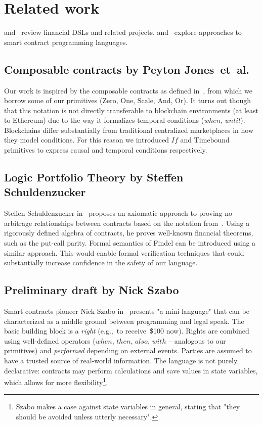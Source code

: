 
\section{Related work}

\cite{Schiller2013} and~\cite{Hvitved2010} review financial DSLs and related projects.
\cite{Seijas2016} and~\cite{Clack2016} explore approaches to smart contract programming languages.

\subsection{Composable contracts by Peyton Jones~et~al.}

Our work is inspired by the composable contracts as defined in~\cite{Jones2003}, from which we borrow some of our primitives (\(\mathrm{Zero}\), \(\mathrm{One}\), \(\mathrm{Scale}\), \(\mathrm{And}\), \(\mathrm{Or}\)).
It turns out though that this notation is not directly transferable to blockchain environments (at least to Ethereum) due to the way it formalizes temporal conditions (\(when\), \(until\)).
Blockchains differ substantially from traditional centralized marketplaces in how they model conditions.
For this reason we introduced \(If\) and \(\mathrm{Timebound}\) primitives to express causal and temporal conditions respectively.


\subsection{Logic Portfolio Theory by Steffen Schuldenzucker}

Steffen Schuldenzucker in~\cite{Schuldenzucker2016} proposes an axiomatic approach to proving no-arbitrage relationships between contracts based on the notation from~\cite{Jones2003}.
Using a rigorously defined algebra of contracts, he proves well-known financial theorems, such as the put-call parity.
Formal semantics of Findel can be introduced using a similar approach.
This would enable formal verification techniques that could substantially increase confidence in the safety of our language.


\subsection{Preliminary draft by Nick Szabo}

Smart contracts pioneer Nick Szabo in~\cite{Szabo2002} presents "a mini-language" that can be characterized as a middle ground between programming and legal speak.
The basic building block is a \textit{right} (e.g.,~to receive~\$100 now).
Rights are combined using well-defined operators (\(when\), \(then\), \(also\), \(with\) -- analogous to our primitives) and \textit{performed} depending on external events.
Parties are assumed to have a trusted source of real-world information.
The language is not purely declarative: contracts may perform calculations and save values in state variables, which allows for more flexibility\footnote{Szabo makes a case against state variables in general, stating that "they should be avoided unless utterly necessary".}.



